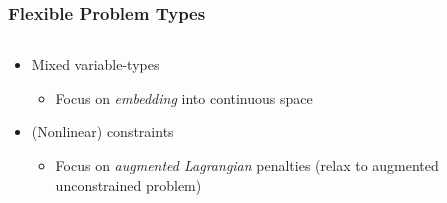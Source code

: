 \documentclass[aspectratio=169]{beamer}
\begin{document}
\begin{frame}\frametitle{Flexible Problem Types}
\begin{columns}
\begin{column}{0.8\textwidth}
\begin{itemize}
 \item Mixed variable-types
\begin{itemize}
 \item Focus on {\it embedding} into continuous space\\
\bigskip
\bigskip

\end{itemize}
 \item (Nonlinear) constraints
\begin{itemize}
 \item Focus on {\it augmented Lagrangian} penalties
(relax to augmented unconstrained problem)
\end{itemize}
\end{itemize}
\end{column}
\begin{column}{0.2\textwidth}
\\

\end{column}
\end{columns}
\end{frame}
\end{document}
